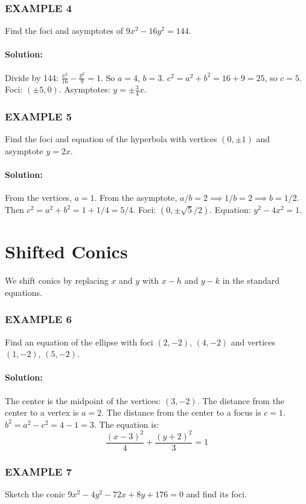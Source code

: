 \documentclass{article}
\begin{document}
\subsubsection*{EXAMPLE 4}
Find the foci and asymptotes of $9x^2 - 16y^2 = 144$.

\paragraph{Solution:} Divide by 144: $\frac{x^2}{16} - \frac{y^2}{9} = 1$.
So $a=4$, $b=3$. $c^2 = a^2 + b^2 = 16+9=25$, so $c=5$.
Foci: $(\pm5, 0)$. Asymptotes: $y = \pm\frac{3}{4}x$.

\subsubsection*{EXAMPLE 5}
Find the foci and equation of the hyperbola with vertices $(0, \pm1)$ and asymptote $y = 2x$.

\paragraph{Solution:}
From the vertices, $a=1$. From the asymptote, $a/b = 2 \implies 1/b = 2 \implies b = 1/2$.
Then $c^2 = a^2 + b^2 = 1 + 1/4 = 5/4$.
Foci: $(0, \pm\sqrt{5}/2)$. Equation: $y^2 - 4x^2 = 1$.

\section*{Shifted Conics}
We shift conics by replacing $x$ and $y$ with $x-h$ and $y-k$ in the standard equations.

\subsubsection*{EXAMPLE 6}
Find an equation of the ellipse with foci $(2, -2)$, $(4, -2)$ and vertices $(1, -2)$, $(5, -2)$.

\paragraph{Solution:}
The center is the midpoint of the vertices: $(3, -2)$. The distance from the center to a vertex is $a = 2$. The distance from the center to a focus is $c = 1$.
$b^2 = a^2 - c^2 = 4 - 1 = 3$. The equation is:
\[
\frac{(x-3)^2}{4} + \frac{(y+2)^2}{3} = 1
\]

\subsubsection*{EXAMPLE 7}
Sketch the conic $9x^2 - 4y^2 - 72x + 8y + 176 = 0$ and find its foci.
\end{document}
